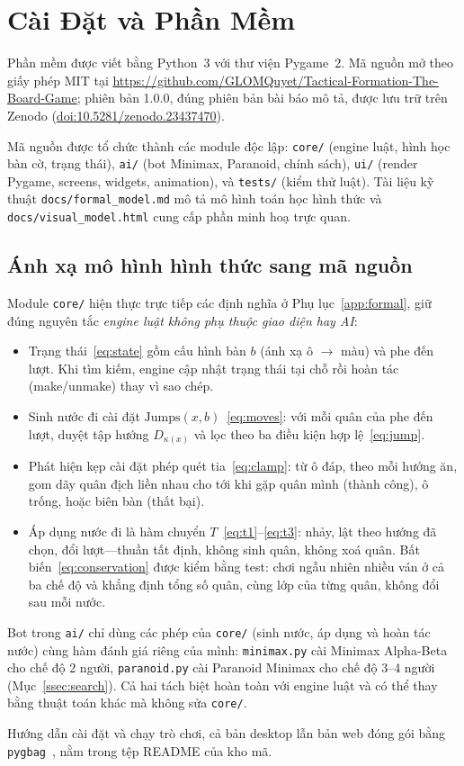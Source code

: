 \section{Cài Đặt và Phần Mềm}
\label{sec:impl}

Phần mềm được viết bằng Python~3 với thư viện Pygame~2. Mã nguồn mở theo
giấy phép MIT tại
\url{https://github.com/GLOMQuyet/Tactical-Formation-The-Board-Game};
phiên bản 1.0.0, đúng phiên bản bài báo mô tả, được lưu trữ trên Zenodo
(\href{https://doi.org/10.5281/zenodo.23437470}{doi:10.5281/zenodo.23437470}).

Mã nguồn được tổ chức thành các module độc lập: \texttt{core/} (engine
luật, hình học bàn cờ, trạng thái), \texttt{ai/} (bot Minimax,
Paranoid, chính sách), \texttt{ui/} (render Pygame, screens, widgets,
animation), và \texttt{tests/} (kiểm thử luật). Tài liệu kỹ thuật
\texttt{docs/formal\_model.md} mô tả mô hình toán học hình thức và
\texttt{docs/visual\_model.html} cung cấp phần minh hoạ trực quan.

\subsection{Ánh xạ mô hình hình thức sang mã nguồn}
\label{ssec:mapping}

Module \texttt{core/} hiện thực trực tiếp các định nghĩa ở
Phụ lục~\ref{app:formal}, giữ đúng nguyên tắc \emph{engine luật không phụ
thuộc giao diện hay AI}:
\begin{itemize}[noitemsep,topsep=2pt]
  \item Trạng thái~\eqref{eq:state} gồm cấu hình bàn $b$ (ánh xạ ô $\to$
        màu) và phe đến lượt. Khi tìm kiếm, engine cập nhật trạng thái tại
        chỗ rồi hoàn tác (make/unmake) thay vì sao chép.
  \item Sinh nước đi cài đặt $\mathrm{Jumps}(x,b)$~\eqref{eq:moves}: với
        mỗi quân của phe đến lượt, duyệt tập hướng $D_{\kappa(x)}$ và lọc
        theo ba điều kiện hợp lệ~\eqref{eq:jump}.
  \item Phát hiện kẹp cài đặt phép quét tia~\eqref{eq:clamp}: từ ô đáp,
        theo mỗi hướng ăn, gom dãy quân địch liền nhau cho tới khi gặp
        quân mình (thành công), ô trống, hoặc biên bàn (thất bại).
  \item Áp dụng nước đi là hàm chuyển $T$~\eqref{eq:t1}--\eqref{eq:t3}:
        nhảy, lật theo hướng đã chọn, đổi lượt---thuần tất định, không
        sinh quân, không xoá quân. Bất biến~\eqref{eq:conservation} được
        kiểm bằng test: chơi ngẫu nhiên nhiều ván ở cả ba chế độ và khẳng
        định tổng số quân, cùng lớp của từng quân, không đổi sau mỗi nước.
\end{itemize}
Bot trong \texttt{ai/} chỉ dùng các phép của \texttt{core/} (sinh nước, áp
dụng và hoàn tác nước) cùng hàm đánh giá riêng của mình: \texttt{minimax.py} cài Minimax Alpha-Beta cho chế độ 2 người,
\texttt{paranoid.py} cài Paranoid Minimax cho chế độ 3--4 người
(Mục~\ref{ssec:search}). Cả hai tách biệt hoàn toàn với engine luật và có thể thay
bằng thuật toán khác mà không sửa \texttt{core/}.

Hướng dẫn cài đặt và chạy trò chơi, cả bản desktop lẫn bản web đóng gói
bằng \texttt{pygbag}~\citep{pygbag}, nằm trong tệp README của kho mã.
